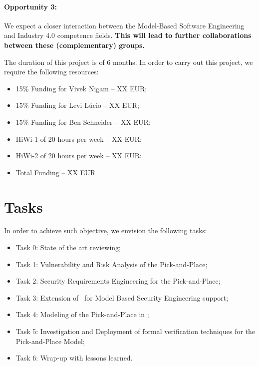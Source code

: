\paragraph{Opportunity 3:} We expect a closer interaction between the Model-Based Software Engineering and Industry 4.0 competence fields. \textbf{This will lead to further collaborations between these (complementary) groups.}

\bigskip


The duration of this project is of 6 months. In order to carry out this project, we require the following resources:

\begin{itemize}
  \item 15\% Funding for Vivek Nigam -- XX EUR;
  \item 15\% Funding for Levi L\'ucio -- XX EUR;
  \item 15\% Funding for Ben Schneider -- XX EUR;
  \item HiWi-1 of 20 hours per week -- XX EUR;
  \item HiWi-2 of 20 hours per week -- XX EUR:
  \item Total Funding -- XX EUR
\end{itemize}

\section{Tasks}

In order to achieve such objective, we envision the following tasks:

\begin{itemize}
  \item Task 0: State of the art reviewing;
  \item Task 1: Vulnerability and Risk Analysis of the Pick-and-Place;  
  \item Task 2: Security Requirements Engineering for the Pick-and-Place; 
  \item Task 3: Extension of \autofocus\ for Model Based Security Engineering support;
  \item Task 4: Modeling of the Pick-and-Place in \autofocus;
  \item Task 5: Investigation and Deployment of formal verification techniques for the Pick-and-Place Model;
  \item Task 6: Wrap-up with lessons learned.
\end{itemize}

